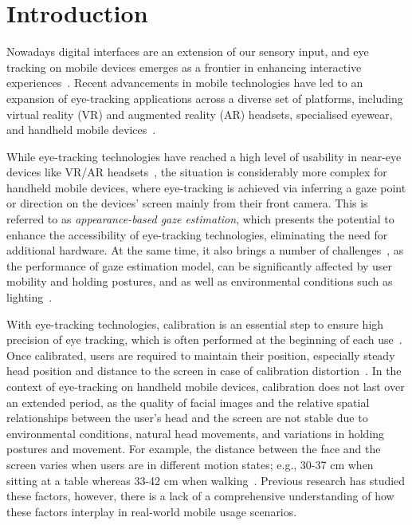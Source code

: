 \section{Introduction}
Nowadays digital interfaces are an extension of our sensory input, and eye tracking on mobile devices emerges as a frontier in enhancing interactive experiences~\cite{lei2023end}. Recent advancements in mobile technologies  have led to an expansion of eye-tracking applications across a diverse set of platforms, including virtual reality (VR) and augmented reality (AR) headsets, specialised eyewear, 
and handheld mobile devices~\cite{blignaut2016idiosyncratic, menges2019improving}.


While eye-tracking technologies have reached a high level of usability in near-eye devices like VR/AR headsets~\cite{clay2019eye, palmero2021openeds2020}, the situation is considerably more complex for handheld mobile devices, where eye-tracking is achieved via inferring a gaze point or direction on the devices' screen mainly from their front camera. This is referred to as \textit{appearance-based gaze estimation}, which presents the potential to enhance the accessibility of eye-tracking technologies, eliminating the need for additional hardware. At the same time, it also brings a number of challenges~\cite{khamis2018understanding, lei2023DynamicRead, bace2020quantification}, as the performance of gaze estimation model, can be significantly affected by user mobility and holding postures, and as well as environmental conditions such as lighting~\cite{valliappan2020accelerating, cheng2024benchmark}. 


With eye-tracking technologies, calibration is an essential step to ensure high precision of eye tracking, which is often performed at the beginning of each use~\cite{duchowski2017eye,tobii2022calib}. Once calibrated, users are required to maintain their position, especially steady head position and distance to the screen in case of calibration distortion~\cite{huang2019saccalib, martschinke2019gaze}. In the context of eye-tracking on handheld mobile devices, calibration does not last over an extended period, as the quality of facial images and the relative spatial relationships between the user's head and the screen are not stable due to environmental conditions, natural head movements, and variations in holding postures and movement. For example, the distance between the face and the screen varies when users are in different motion states; e.g., 30-37 cm when sitting at a table whereas 33-42 cm when walking~\cite{huang2017screenglint}. Previous research has studied these factors, however, there is a lack of a comprehensive understanding of how these factors interplay in real-world mobile usage scenarios.


